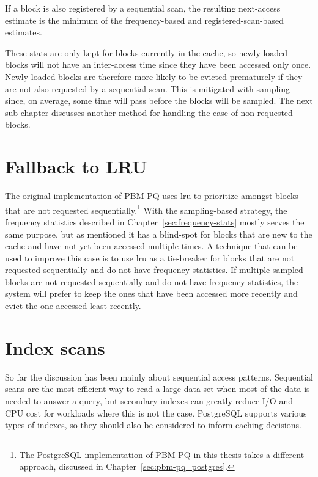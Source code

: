 If a block is also registered by a sequential scan, the resulting next-access estimate is the minimum of the frequency-based and registered-scan-based estimates.

These stats are only kept for blocks currently in the cache, so newly loaded blocks will not have an inter-access time since they have been accessed only once. Newly loaded blocks are therefore more likely to be evicted prematurely if they are not also requested by a sequential scan. This is mitigated with sampling since, on average, some time will pass before the blocks will be sampled. The next sub-chapter discusses another method for handling the case of non-requested blocks.

\section{\label{sec:lru_nr}Fallback to LRU}


The original implementation of PBM-PQ \cite{pbm} uses \gls{lru} to prioritize amongst blocks that are not requested sequentially.\footnote{The PostgreSQL implementation of PBM-PQ in this thesis takes a different approach, discussed in Chapter~\ref{sec:pbm-pq_postgres}.} With the sampling-based strategy, the frequency statistics described in Chapter~\ref{sec:frequency-stats} mostly serves the same purpose, but as mentioned it has a blind-spot for blocks that are new to the cache and have not yet been accessed multiple times. A technique that can be used to improve this case is to use \gls{lru} as a tie-breaker for blocks that are not requested sequentially and do not have frequency statistics. If multiple sampled blocks are not requested sequentially and do not have frequency statistics, the system will prefer to keep the ones that have been accessed more recently and evict the one accessed least-recently. %


\section{\label{sec:index_scans}Index scans}

So far the discussion has been mainly about sequential access patterns. Sequential scans are the most efficient way to read a large data-set when most of the data is needed to answer a query, but secondary indexes can greatly reduce I/O and CPU cost for workloads where this is not the case. PostgreSQL supports various types of indexes, so they should also be considered to inform caching decisions.

